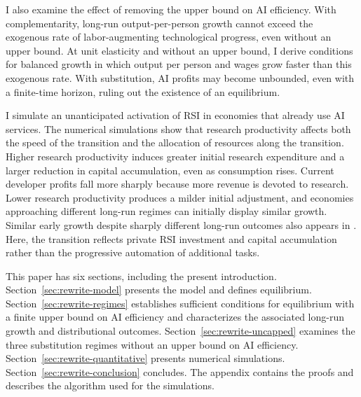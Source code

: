 I also examine the effect of removing the upper bound on AI efficiency. With complementarity, long-run output-per-person growth cannot exceed the exogenous rate of labor-augmenting technological progress, even without an upper bound. At unit elasticity and without an upper bound, I derive conditions for balanced growth in which output per person and wages grow faster than this exogenous rate. With substitution, AI profits may become unbounded, even with a finite-time horizon, ruling out the existence of an equilibrium.

I simulate an unanticipated activation of RSI in economies that already use AI services. The numerical simulations show that research productivity affects both the speed of the transition and the allocation of resources along the transition. Higher research productivity induces greater initial research expenditure and a larger reduction in capital accumulation, even as consumption rises. Current developer profits fall more sharply because more revenue is devoted to research. Lower research productivity produces a milder initial adjustment, and economies approaching different long-run regimes can initially display similar growth. %
Similar early growth despite sharply different long-run outcomes also
appears in \citet{jonestonetti2026}. Here, the transition reflects
private RSI investment and capital accumulation rather than the
progressive automation of additional tasks.

This paper has six sections, including the present introduction. Section~\ref{sec:rewrite-model} presents the model and defines equilibrium. Section~\ref{sec:rewrite-regimes} establishes sufficient conditions for equilibrium with a finite upper bound on AI efficiency and characterizes the associated long-run growth and distributional outcomes. Section~\ref{sec:rewrite-uncapped} examines the three substitution regimes without an upper bound on AI efficiency. Section~\ref{sec:rewrite-quantitative} presents numerical simulations. Section~\ref{sec:rewrite-conclusion} concludes. The appendix contains the proofs and describes the algorithm used for the simulations.
